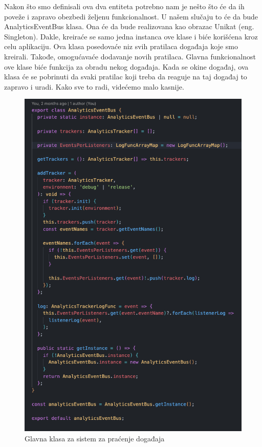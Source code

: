 \documentclass[12pt,oneside]{memoir}
\begin{document}
Nakon što smo definisali ova dva entiteta potrebno nam je nešto što će da ih poveže i zapravo obezbedi željenu funkcionalnost. U našem slučaju to će da bude AnalyticsEventBus klasa. Ona će da bude realizovana kao obrazac Unikat (eng. Singleton). Dakle, kreiraće se samo jedna instanca ove klase i biće korišćena kroz celu aplikaciju. Ova klasa posedovaće niz svih pratilaca događaja koje smo kreirali. Takođe, omogućavaće dodavanje novih pratilaca. Glavna funkcionalnost ove klase biće funkcija za obradu nekog događaja. Kada se okine događaj, ova klasa će se pobrinuti da svaki pratilac koji treba da reaguje na taj događaj to zapravo i uradi. Kako sve to radi, videćemo malo kasnije.

\begin{figure}[h!]
\centering
\includegraphics[scale=0.45]{docs/images/chapterSix/analyticsEventBus.png}
\caption{Glavna klasa za sistem za praćenje događaja}
\label{fig:analyticsEventBus}
\end{figure}
\end{document}
